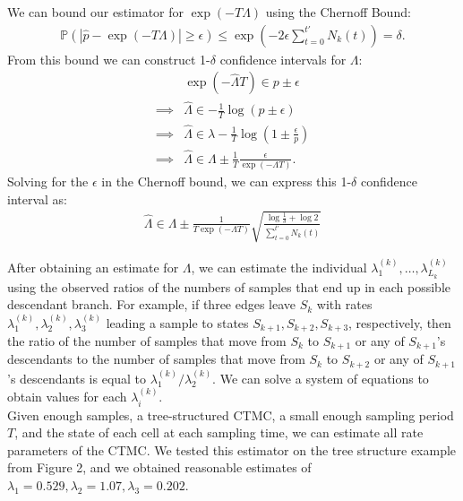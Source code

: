 \documentclass[11pt,onecolumn]{article}
\begin{document}
We can bound our estimator for $\exp(-T\Lambda)$ using the Chernoff Bound:
\begin{align*}
	\mathbb{P} \left( \left| \hat{p} - \exp(-T\Lambda) \right| \geq \epsilon \right)  \leq \exp\left(-2\epsilon \sum_{t=0}^{t'} N_k(t) \right) = \delta.
\end{align*}
From this bound we can construct 1-$\delta$ confidence intervals for $\Lambda$:
\begin{align*}
	& \exp(- \hat{\Lambda} T) \in {p} \pm \epsilon \\
	\implies & \hat{\Lambda} \in -\frac{1}{T} \log ({p} \pm \epsilon) \\
	\implies & \hat{\Lambda} \in \lambda - \frac{1}{T} \log \left( 1 \pm \frac{\epsilon}{p} \right) \\
	\implies & \hat{\Lambda} \in \Lambda \pm \frac{1}{T} \frac{\epsilon}{\exp(-\Lambda T)}.
\end{align*}
Solving for the $\epsilon$ in the Chernoff bound, we can express this 1-$\delta$ confidence interval as:
\begin{align*}
	\hat{\Lambda} \in \Lambda \pm \frac{1}{T\exp(-\Lambda T)} \sqrt{\frac{\log \frac{1}{\delta}+\log 2}{\sum_{t=0}^{t'} N_k(t)}} 
\end{align*}

After obtaining an estimate for $\Lambda$, we can estimate the individual $\lambda_1^{(k)},\dots,\lambda_{L_k}^{(k)}$ using the observed ratios of the numbers of samples that end up in each possible descendant branch. For example, if three edges leave $S_k$ with rates $\lambda_1^{(k)},\lambda_2^{(k)},\lambda_3^{(k)}$ leading a sample to states $S_{k+1},S_{k+2},S_{k+3}$, respectively, then the ratio of the number of samples that move from $S_k$ to $S_{k+1}$ or any of $S_{k+1}$'s descendants to the number of samples that move from $S_k$ to $S_{k+2}$ or any of $S_{k+1}$'s descendants is equal to $\lambda_1^{(k)}/\lambda_2^{(k)}$. We can solve a system of equations to obtain values for each $\lambda_i^(k)$. \\

Given enough samples, a tree-structured CTMC, a small enough sampling period $T$, and the state of each cell at each sampling time, we can estimate all rate parameters of the CTMC. We tested this estimator on the tree structure example from Figure 2, and we obtained reasonable estimates of $\lambda_1 = 0.529, \lambda_2 = 1.07, \lambda_3 = 0.202$.
\end{document}
